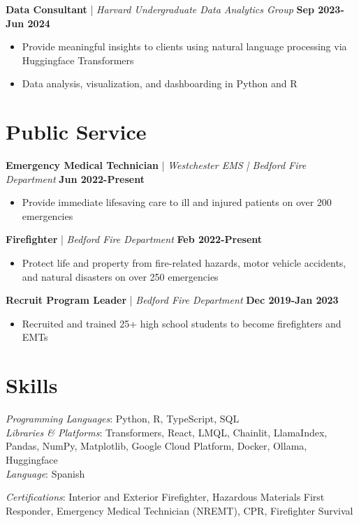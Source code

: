 \documentclass[letterpaper,10.5pt]{article}
\begin{document}
\noindent\textbf{Data Consultant} | \textit{Harvard Undergraduate Data Analytics Group} \hfill \textbf{Sep 2023-Jun 2024}
\begin{itemize}
  \item Provide meaningful insights to clients using natural language processing via Huggingface Transformers
  \item Data analysis, visualization, and dashboarding in Python and R
\end{itemize}

\section{Public Service}

\noindent\textbf{Emergency Medical Technician} | \textit{Westchester EMS | Bedford Fire Department} \hfill \textbf{Jun 2022-Present}
\begin{itemize}
  \item Provide immediate lifesaving care to ill and injured patients on over 200 emergencies
\end{itemize}

\noindent\textbf{Firefighter} | \textit{Bedford Fire Department} \hfill \textbf{Feb 2022-Present}
\begin{itemize}
  \item Protect life and property from fire-related hazards, motor vehicle accidents, and natural disasters on over 250 emergencies
\end{itemize}

\noindent\textbf{Recruit Program Leader} | \textit{Bedford Fire Department} \hfill \textbf{Dec 2019-Jan 2023}
\begin{itemize}
  \item Recruited and trained 25+ high school students to become firefighters and EMTs
\end{itemize}

\section{Skills}

\noindent
\begin{minipage}[t]{0.48\textwidth}
  \textit{Programming Languages}: Python, R, TypeScript, SQL\\[1pt]
  \textit{Libraries \& Platforms}: Transformers, React, LMQL, Chainlit, 
  LlamaIndex, Pandas, NumPy, Matplotlib, Google Cloud 
  Platform, Docker, Ollama, Huggingface\\[1pt]
  \textit{Language}: Spanish
\end{minipage}
\hfill
\begin{minipage}[t]{0.48\textwidth}
  \textit{Certifications}: Interior and Exterior Firefighter, Hazardous 
  Materials First Responder, Emergency Medical Technician 
  (NREMT), CPR, Firefighter Survival
\end{minipage}
\end{document}
